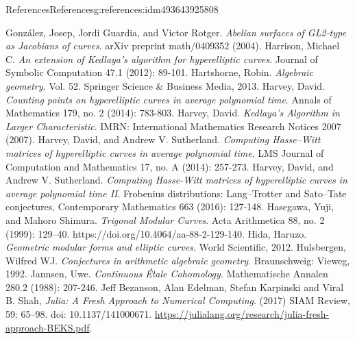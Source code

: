 \documentclass[oneside,10pt,]{book}
\numberwithin{equation}{section}
\begin{document}
\begin{references-chapter-numberless}{References}{}{References}{}{}{g:references:idm493643925808}
\begin{thebibliography}{9}
\hypertarget{x:biblio:bib-gonzales-guardia-rotger}{}González, Josep, Jordi Guardia, and Victor Rotger. \textit{Abelian surfaces of GL2-type as Jacobians of curves}. arXiv preprint math\slash{}0409352 (2004).
\hypertarget{x:biblio:bib-harrison-hyperelliptic}{}Harrison, Michael C. \textit{An extension of Kedlaya's algorithm for hyperelliptic curves}. Journal of Symbolic Computation 47.1 (2012): 89-101.
\hypertarget{x:biblio:bib-hartshorne}{}Hartshorne, Robin. \textit{Algebraic geometry}. Vol. 52. Springer Science \& Business Media, 2013.
\hypertarget{x:biblio:bib-harvey-average}{}Harvey, David. \textit{Counting points on hyperelliptic curves in average polynomial time}. Annals of Mathematics 179, no. 2 (2014): 783-803.
\hypertarget{x:biblio:bib-harvey-sqrtp}{}Harvey, David. \textit{Kedlaya's Algorithm in Larger Characteristic}. IMRN: International Mathematics Research Notices 2007 (2007).
\hypertarget{x:biblio:bib-harvey-sutherland}{}Harvey, David, and Andrew V. Sutherland. \textit{Computing Hasse–Witt matrices of hyperelliptic curves in average polynomial time}. LMS Journal of Computation and Mathematics 17, no. A (2014): 257-273.
\hypertarget{x:biblio:bib-harvey-sutherland-ii}{}Harvey, David, and Andrew V. Sutherland. \textit{Computing Hasse-Witt matrices of hyperelliptic curves in average polynomial time II}. Frobenius distributions: Lang–Trotter and Sato–Tate conjectures, Contemporary Mathematics 663 (2016): 127-148.
\hypertarget{x:biblio:bib-hasegawa-shimura}{}Hasegawa, Yuji, and Mahoro Shimura. \textit{Trigonal Modular Curves}. Acta Arithmetica 88, no. 2 (1999): 129–40. https:\slash{}\slash{}doi.org\slash{}10.4064\slash{}aa-88-2-129-140.
\hypertarget{x:biblio:bib-hida-geometric}{}Hida, Haruzo. \textit{Geometric modular forms and elliptic curves}. World Scientific, 2012.
\hypertarget{x:biblio:bib-hulsbergen}{}Hulsbergen, Wilfred WJ. \textit{Conjectures in arithmetic algebraic geometry}. Braunschweig: Vieweg, 1992.
\hypertarget{x:biblio:bib-jannsen}{}Jannsen, Uwe. \textit{Continuous Étale Cohomology}. Mathematische Annalen 280.2 (1988): 207-246.
\hypertarget{x:biblio:bib-julia}{}Jeff Bezanson, Alan Edelman, Stefan Karpinski and Viral B. Shah, \textit{Julia: A Fresh Approach to Numerical Computing}.  (2017) SIAM Review, 59: 65–98. doi: 10.1137\slash{}141000671. \url{https://julialang.org/research/julia-fresh-approach-BEKS.pdf}.

\end{thebibliography}
\end{references-chapter-numberless}
\end{document}
